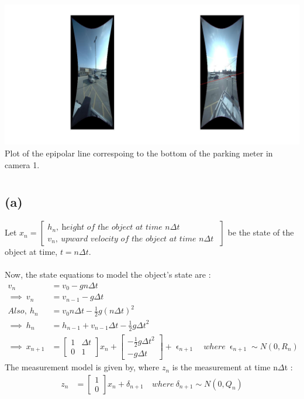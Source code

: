 \documentclass[a4paper,fleqn,11pt]{article}
\theoremstyle{mytheor}
\begin{document}
\section{}
\begin{center}
\includegraphics[scale= 0.37]{../images/q5.jpg} \\
Plot of the epipolar line correspoing to the bottom of the parking meter in camera 1.
\end{center}
\section{}
\subsection*{(a)}
Let $x_n = \begin{bmatrix}
				h_n,\ \textit{height of the object at time n$\Delta$t} \\
				v_n,\ \textit{upward velocity of the object at time n$\Delta$t }
		   \end{bmatrix}$ be the state of the object at time, $t = n \Delta t$. \\ \\
Now, the state equations to model the object's state are :
\begin{align*}
v_n & = v_0 - g n \Delta t \\
\implies\ v_n & = v_{n - 1} - g \Delta t \\
Also,\ h_n & = v_0 n \Delta t - \frac{1}{2}g (n \Delta t)^2 \\
\implies\ h_n & = h_{n - 1} + v_{n - 1} \Delta t -\frac{1}{2}g {\Delta t}^2 \\
\implies\ x_{n + 1} &  = \begin{bmatrix}
					1 & \Delta t \\
					0 &    1
				\end{bmatrix}
				x_n + 
				\begin{bmatrix}
					-\frac{1}{2}g{\Delta t}^ 2 \\
					-g \Delta t 
				\end{bmatrix} + \upvarepsilon_{n + 1}\ & where\
				\upvarepsilon_{n + 1} \sim N (0, R_n)
\end{align*}
The measurement model is given by, where $z_n$ is the measurement at time n$\Delta$t :
\begin{align*}
z_n & = \begin{bmatrix}
			1 \\
			0
		\end{bmatrix} x_n
		+ \delta_{n + 1}\ & where\ \delta_{n + 1} \sim N (0, Q_n)
\end{align*}
\end{document}
